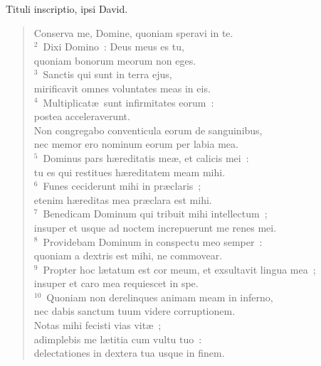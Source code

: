\lettrine[lines=3,image=true,loversize=0.05,lraise=-0.03]{T}{}ituli inscriptio, ipsi David. \begin{flushleft}\begin{verse}\vspace{6pt}Conserva me, Domine, quoniam speravi in te.\\
${}^{2}$~Dixi Domino~: Deus meus es tu,\\ quoniam bonorum meorum non eges.\\
${}^{3}$~Sanctis qui sunt in terra ejus,\\ mirificavit omnes voluntates meas in eis.\\
${}^{4}$~Multiplicat\ae\ sunt infirmitates eorum~:\\ postea acceleraverunt.\\ Non congregabo conventicula eorum de sanguinibus,\\ nec memor ero nominum eorum per labia mea.\\
${}^{5}$~Dominus pars h\ae reditatis me\ae , et calicis mei~:\\ tu es qui restitues h\ae reditatem meam mihi.\\
${}^{6}$~Funes ceciderunt mihi in pr\ae claris~;\\ etenim h\ae reditas mea pr\ae clara est mihi.\\
${}^{7}$~Benedicam Dominum qui tribuit mihi intellectum~;\\ insuper et usque ad noctem increpuerunt me renes mei.\\
${}^{8}$~Providebam Dominum in conspectu meo semper~:\\ quoniam a dextris est mihi, ne commovear.\\
${}^{9}$~Propter hoc l\ae tatum est cor meum, et exsultavit lingua mea~;\\ insuper et caro mea requiescet in spe.\\
${}^{10}$~Quoniam non derelinques animam meam in inferno,\\ nec dabis sanctum tuum videre corruptionem.\\ Notas mihi fecisti vias vit\ae~;\\ adimplebis me l\ae titia cum vultu tuo~:\\ delectationes in dextera tua usque in finem.\end{verse}\end{flushleft}



